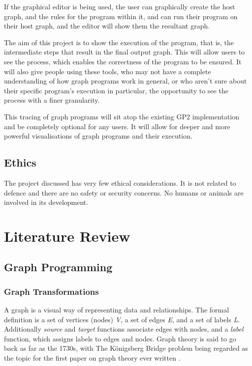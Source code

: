 \documentclass{UoYCSproject}
\begin{document}
If the graphical editor is being used, the user can graphically create the host graph, and the rules for the program within it, and can run their program on their host graph, and the editor will show them the resultant graph.

The aim of this project is to show the execution of the program, that is, the intermediate steps that result in the final output graph. This will allow users to see the process, which enables the correctness of the program to be ensured. It will also give people using these tools, who may not have a complete understanding of how graph programs work in general, or who aren't sure about their specific program's execution in particular, the opportunity to see the process with a finer granularity.

This tracing of graph programs will sit atop the existing GP2 implementation and be completely optional for any users. It will allow for deeper and more powerful visualisations of graph programs and their execution.
%

\section{Ethics}
The project discussed has very few ethical considerations. It is not related to defence and there are no safety or security concerns. No humans or animals are involved in its development.

\chapter{Literature Review}
\section{Graph Programming}

\subsection{Graph Transformations}
A graph is a visual way of representing data and relationships. The formal definition is a set of vertices (nodes) \emph{V}, a set of edges \emph{E}, and a set of labels \emph{L}. Additionally \emph{source} and \emph{target} functions associate edges with nodes, and a \emph{label} function, which assigns labels to edges and nodes.
Graph theory is said to go back as far as the 1730s, with The K{\"o}nigsberg Bridge problem being regarded as the topic for the first paper on graph theory ever written \cite{grathe_origin}. 
\end{document}
